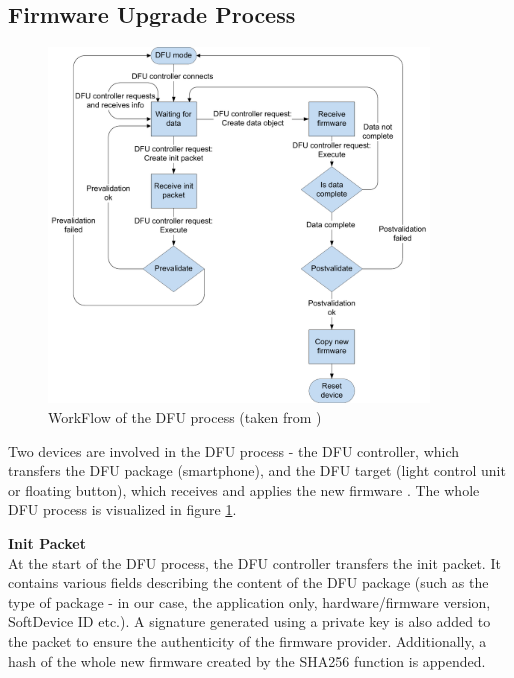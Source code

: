     
    \subsection{Firmware Upgrade Process}
        \label{sec:dfu_process}
        \begin{figure} [!ht]
    	    \centering
    	    \includegraphics[width=0.9\textwidth]{SW_Firmware/Figs/nrf52_dfu.pdf}
            \caption {WorkFlow of the DFU process (taken from \cite{nrf52doc:dfu_process})}
            \label{figure:dfu}
        \end{figure}  
        
        Two devices are involved in the DFU process - the DFU controller, which transfers the DFU package (smartphone), and the DFU target (light control unit or floating button), which receives and applies the new firmware \cite{nrf52doc:dfu_process}. The whole DFU process is visualized in figure \ref{figure:dfu}.
        
        
        \textbf{Init Packet}\\ 
         At the start of the DFU process, the DFU controller transfers the init packet. It contains various fields describing the content of the DFU package (such as the type of package - in our case, the application only, hardware/firmware version, SoftDevice ID etc.). A signature generated using a private key is also added to the packet to ensure the authenticity of the firmware provider. Additionally, a hash of the whole new firmware created by the SHA256 function is appended.

